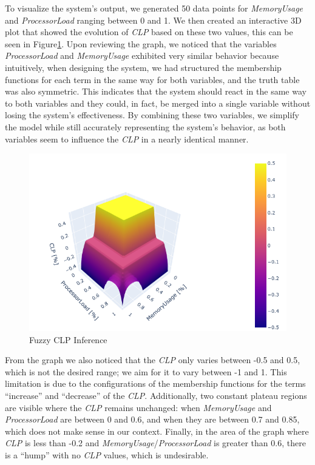 \documentclass[11pt]{report}
\begin{document}
To visualize the system's output, we generated 50 data points for \textit{MemoryUsage} and \textit{ProcessorLoad} ranging between 0 and 1.
We then created an interactive 3D plot that showed the evolution of \textit{CLP} based on these two values, this can be seen in Figure\ref{fig:3d_triangular}.
Upon reviewing the graph, we noticed that the variables \textit{ProcessorLoad} and \textit{MemoryUsage} exhibited very similar behavior because intuitively, when designing the system, we had structured the membership functions for each term in the same way for both variables, and the truth table was also symmetric.
This indicates that the system should react in the same way to both variables and they could, in fact, be merged into a single variable without losing the system's effectiveness.
By combining these two variables, we simplify the model while still accurately representing the system's behavior, as both variables seem to influence the \textit{CLP} in a nearly identical manner.


\begin{figure}[H]
    \centering
\includegraphics[scale = 0.8]{../images/3d_triangular}
\caption{Fuzzy CLP Inference}
\label{fig:3d_triangular}
\end{figure}

\vspace{10mm}

From the graph we also noticed that the \textit{CLP} only varies between -0.5 and 0.5, which is not the desired range; we aim for it to vary between -1 and 1.
This limitation is due to the configurations of the membership functions for the terms ``increase'' and ``decrease'' of the \textit{CLP}.
Additionally, two constant plateau regions are visible where the \textit{CLP} remains unchanged: when \textit{MemoryUsage} and \textit{ProcessorLoad} are between 0 and 0.6, and when they are between 0.7 and 0.85, which does not make sense in our context.
Finally, in the area of the graph where \textit{CLP} is less than -0.2 and \textit{MemoryUsage}/\textit{ProcessorLoad} is greater than 0.6, there is a ``hump'' with no \textit{CLP} values, which is undesirable.
\end{document}
